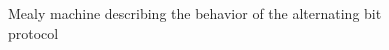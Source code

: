 \begin{figure}[!ht] 
	\centering
	\caption{Mealy machine describing the behavior of the alternating bit protocol} 
	\label{fig_alternatingbit}
\end{figure}

